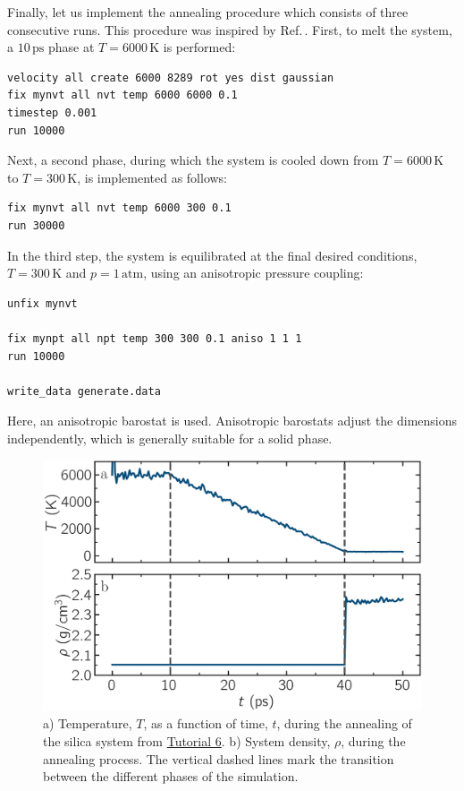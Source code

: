 \documentclass[9pt,tutorial]{livecoms}
\begin{document}
Finally, let us implement the annealing procedure which
consists of three consecutive runs.  This procedure was inspired
by Ref.\,\cite{della1992molecular}.  First, to melt the system,
a $10\,\text{ps}$ phase at $T = 6000\,\text{K}$ is performed:
\begin{lstlisting}
velocity all create 6000 8289 rot yes dist gaussian
fix mynvt all nvt temp 6000 6000 0.1
timestep 0.001
run 10000
\end{lstlisting}
Next, a second phase, during which the system is cooled down from $T = 6000\,\text{K}$
to $T = 300\,\text{K}$, is implemented as follows:
\begin{lstlisting}
fix mynvt all nvt temp 6000 300 0.1
run 30000
\end{lstlisting}
In the third step, the system is equilibrated at the final desired
conditions, $T = 300\,\text{K}$ and $p = 1\,\text{atm}$,
using an anisotropic pressure coupling:
\begin{lstlisting}
unfix mynvt

fix mynpt all npt temp 300 300 0.1 aniso 1 1 1
run 10000

write_data generate.data
\end{lstlisting}
Here, an anisotropic barostat is used.
Anisotropic barostats adjust the dimensions independently, which is
generally suitable for a solid phase.

\begin{figure}
\centering
\includegraphics[width=\linewidth]{GCMC-dimension}
\caption{a) Temperature, $T$, as a function of time, $t$, during the annealing
of the silica system from \hyperref[gcmc-silica-label]{Tutorial 6}.
b) System density, $\rho$, during the annealing process.  The vertical dashed lines
mark the transition between the different phases of the simulation.}
\label{fig:GCMC-dimension}
\end{figure}
\end{document}

